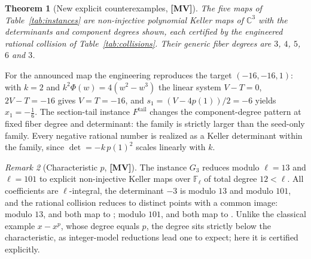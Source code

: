 \documentclass[11pt]{article}
\newtheorem{theorem}{Theorem}[section]
\theoremstyle{definition}
\theoremstyle{remark}
\newtheorem{remark}[theorem]{Remark}
\newcommand{\C}{\mathbb{C}}
\newcommand{\MV}{\textbf{[MV]}}
\begin{document}
\begin{theorem}[New explicit counterexamples, {\MV}]\label{thm:instances}
The five maps of Table~\ref{tab:instances} are non-injective polynomial Keller maps of $\C^3$ with the determinants and component degrees shown, each certified by the engineered rational collision of Table~\ref{tab:collisions}. Their generic fiber degrees are $3$, $4$, $5$, $6$ and $3$.
\end{theorem}

\begin{table}[t]\centering\footnotesize\setlength{\tabcolsep}{3pt}

\caption{Engineered collisions: for each instance of Table~\ref{tab:instances} the target $(A,B,C)$ with $C = 1$ and two distinct rational preimages that both map to it, obtained by Algorithm~\ref{alg:collision} with prescribed fiber roots $w_1 = 1$ and $w_2 = 2$; all images are verified by exact substitution into the full components.}
\label{tab:collisions}
\end{table}

For the announced map the engineering reproduces the target $(-16,-16,1)$: with $k = 2$ and $k^2\Phi(w) = 4(w^2 - w^3)$ the linear system $V - T = 0$, $2V - T = -16$ gives $V = T = -16$, and $s_1 = (V - 4p(1))/2 = -6$ yields $x_1 = -\tfrac16$. The section-tail instance $F^{\mathrm{tail}}$ changes the component-degree pattern at fixed fiber degree and determinant: the family is strictly larger than the seed-only family. Every negative rational number is realized as a Keller determinant within the family, since $\det = -k\,p(1)^2$ scales linearly with $k$.

\begin{remark}[Characteristic $p$, {\MV}]\label{rem:charp}
The instance $G_3$ reduces modulo $\ell = 13$ and $\ell = 101$ to explicit non-injective Keller maps over $\mathbb{F}_\ell$ of total degree $12 < \ell$. All coefficients are $\ell$-integral, the determinant $-3$ is \numDetModThirteen{} modulo $13$ and \numDetModHundred{} modulo $101$, and the rational collision reduces to distinct points with a common image: modulo $13$, \ptModThirteenA{} and \ptModThirteenB{} both map to \ptModThirteenT{}; modulo $101$, \ptModHundredA{} and \ptModHundredB{} both map to \ptModHundredT{}. Unlike the classical example $x - x^p$, whose degree equals $p$, the degree sits strictly below the characteristic, as integer-model reductions lead one to expect; here it is certified explicitly.
\end{remark}
\end{document}
